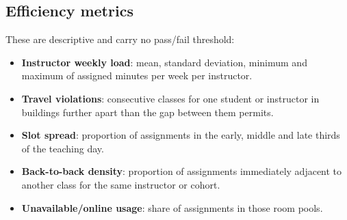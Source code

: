 \subsection{Efficiency metrics}

These are descriptive and carry no pass/fail threshold:

\begin{itemize}
  \item \textbf{Instructor weekly load}: mean, standard deviation, minimum and maximum of assigned
    minutes per week per instructor.
  \item \textbf{Travel violations}: consecutive classes for one student or instructor in buildings
    further apart than the gap between them permits.
  \item \textbf{Slot spread}: proportion of assignments in the early, middle and late thirds of the
    teaching day.
  \item \textbf{Back-to-back density}: proportion of assignments immediately adjacent to another
    class for the same instructor or cohort.
  \item \textbf{Unavailable/online usage}: share of assignments in those room pools.
\end{itemize}

